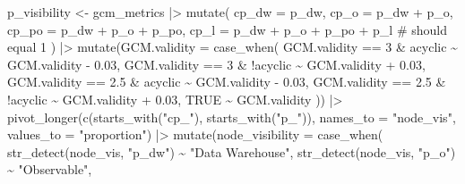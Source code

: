 \documentclass[
  letterpaper,
  DIV=11,
  numbers=noendperiod]{scrartcl}
\newenvironment{Shaded}{\begin{snugshade}}{\end{snugshade}}
\newcommand{\AttributeTok}[1]{\textcolor[rgb]{0.40,0.45,0.13}{#1}}
\newcommand{\CommentTok}[1]{\textcolor[rgb]{0.37,0.37,0.37}{#1}}
\newcommand{\ConstantTok}[1]{\textcolor[rgb]{0.56,0.35,0.01}{#1}}
\newcommand{\DecValTok}[1]{\textcolor[rgb]{0.68,0.00,0.00}{#1}}
\newcommand{\FloatTok}[1]{\textcolor[rgb]{0.68,0.00,0.00}{#1}}
\newcommand{\FunctionTok}[1]{\textcolor[rgb]{0.28,0.35,0.67}{#1}}
\newcommand{\NormalTok}[1]{\textcolor[rgb]{0.00,0.23,0.31}{#1}}
\newcommand{\OtherTok}[1]{\textcolor[rgb]{0.00,0.23,0.31}{#1}}
\newcommand{\SpecialCharTok}[1]{\textcolor[rgb]{0.37,0.37,0.37}{#1}}
\newcommand{\StringTok}[1]{\textcolor[rgb]{0.13,0.47,0.30}{#1}}
\begin{document}
\begin{Shaded}
\begin{Highlighting}[]
\NormalTok{p\_visibility }\OtherTok{\textless{}{-}}\NormalTok{ gcm\_metrics }\SpecialCharTok{|\textgreater{}}
    \FunctionTok{mutate}\NormalTok{(}
        \AttributeTok{cp\_dw =}\NormalTok{ p\_dw,}
        \AttributeTok{cp\_o =}\NormalTok{ p\_dw }\SpecialCharTok{+}\NormalTok{ p\_o,}
        \AttributeTok{cp\_po =}\NormalTok{ p\_dw }\SpecialCharTok{+}\NormalTok{ p\_o }\SpecialCharTok{+}\NormalTok{ p\_po,}
        \AttributeTok{cp\_l =}\NormalTok{ p\_dw }\SpecialCharTok{+}\NormalTok{ p\_o }\SpecialCharTok{+}\NormalTok{ p\_po }\SpecialCharTok{+}\NormalTok{ p\_l }\CommentTok{\# should equal 1}
\NormalTok{    ) }\SpecialCharTok{|\textgreater{}} 
    \FunctionTok{mutate}\NormalTok{(}\AttributeTok{GCM.validity =} \FunctionTok{case\_when}\NormalTok{(}
\NormalTok{        GCM.validity }\SpecialCharTok{==} \DecValTok{3} \SpecialCharTok{\&}\NormalTok{ acyclic }\SpecialCharTok{\textasciitilde{}}\NormalTok{ GCM.validity }\SpecialCharTok{{-}} \FloatTok{0.03}\NormalTok{,}
\NormalTok{        GCM.validity }\SpecialCharTok{==} \DecValTok{3} \SpecialCharTok{\&} \SpecialCharTok{!}\NormalTok{acyclic }\SpecialCharTok{\textasciitilde{}}\NormalTok{ GCM.validity }\SpecialCharTok{+} \FloatTok{0.03}\NormalTok{,}
\NormalTok{        GCM.validity }\SpecialCharTok{==} \FloatTok{2.5} \SpecialCharTok{\&}\NormalTok{ acyclic }\SpecialCharTok{\textasciitilde{}}\NormalTok{ GCM.validity }\SpecialCharTok{{-}} \FloatTok{0.03}\NormalTok{,}
\NormalTok{        GCM.validity }\SpecialCharTok{==} \FloatTok{2.5} \SpecialCharTok{\&} \SpecialCharTok{!}\NormalTok{acyclic }\SpecialCharTok{\textasciitilde{}}\NormalTok{ GCM.validity }\SpecialCharTok{+} \FloatTok{0.03}\NormalTok{,}
        \ConstantTok{TRUE} \SpecialCharTok{\textasciitilde{}}\NormalTok{ GCM.validity}
\NormalTok{    )) }\SpecialCharTok{|\textgreater{}} 
    \FunctionTok{pivot\_longer}\NormalTok{(}\FunctionTok{c}\NormalTok{(}\FunctionTok{starts\_with}\NormalTok{(}\StringTok{"cp\_"}\NormalTok{), }\FunctionTok{starts\_with}\NormalTok{(}\StringTok{"p\_"}\NormalTok{)), }\AttributeTok{names\_to =} \StringTok{"node\_vis"}\NormalTok{, }\AttributeTok{values\_to =} \StringTok{"proportion"}\NormalTok{) }\SpecialCharTok{|\textgreater{}} 
    \FunctionTok{mutate}\NormalTok{(}\AttributeTok{node\_visibility =} \FunctionTok{case\_when}\NormalTok{(}
        \FunctionTok{str\_detect}\NormalTok{(node\_vis, }\StringTok{"p\_dw"}\NormalTok{) }\SpecialCharTok{\textasciitilde{}} \StringTok{"Data Warehouse"}\NormalTok{,}
        \FunctionTok{str\_detect}\NormalTok{(node\_vis, }\StringTok{"p\_o"}\NormalTok{) }\SpecialCharTok{\textasciitilde{}} \StringTok{"Observable"}\NormalTok{,}

\end{Highlighting}
\end{Shaded}
\end{document}
